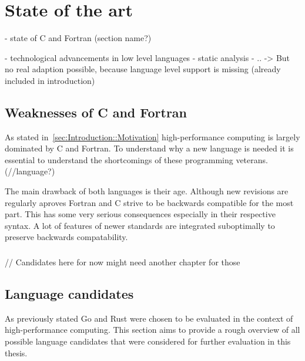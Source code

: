 \chapter{State of the art}
\label{chap:State_of_the_art}


- state of C and Fortran (section name?)

- technological advancements in low level languages
    - static analysis
    - ..
    -> But no real adaption possible, because language level support is missing (already included in introduction)

\section{Weaknesses of C and Fortran} %
\label{sec:State_of_the_art::Weaknesses}

As stated in~\autoref{sec:Introduction::Motivation} high-performance computing is largely dominated by C and Fortran. To understand why a new language is needed it is essential to understand the shortcomings of these programming veterans. (//language?)

The main drawback of both languages is their age. Although new revisions are regularly aproves Fortran and C strive to be backwards compatible for the most part. This has some very serious consequences especially in their respective syntax. A lot of features of newer standards are integrated suboptimally to preserve backwards compatability.

\subsection*{}

// Candidates here for now might need another chapter for those
\section{Language candidates}
\label{sec:State_of_the_art::Candidates}

As previously stated Go and Rust were chosen to be evaluated in the context of high-performance computing. This section aims to provide a rough overview of all possible language candidates that were considered for further evaluation in this thesis.

